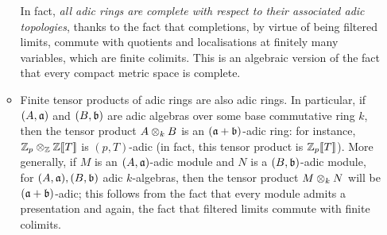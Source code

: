 \begin{example}
\begin{enumerate}
\begin{itemize}
                            In fact, \textit{all adic rings are complete with respect to their associated adic topologies}, thanks to the fact that completions, by virtue of being filtered limits, commute with quotients and localisations at finitely many variables, which are finite colimits. This is an algebraic version of the fact that every compact metric space is complete.  
                            \item Finite tensor products of adic rings are also adic rings. In particular, if $(A, \mathfrak{a})$ and $(B, \mathfrak{b})$ are adic algebras over some base commutative ring $k$, then the tensor product $A \tensor_k B$ is an $(\mathfrak{a} + \mathfrak{b})$-adic ring: for instance, $\Z_p \tensor_{\Z} \Z[\![T]\!]$ is $(p, T)$-adic (in fact, this tensor product is $\mathbb{Z}_p[\![T]\!]$). More generally, if $M$ is an $(A, \mathfrak{a})$-adic module and $N$ is a $(B, \mathfrak{b})$-adic module, for $(A, \mathfrak{a}), (B, \mathfrak{b})$ adic $k$-algebras, then the tensor product $M \tensor_k N$ will be $(\mathfrak{a} + \mathfrak{b})$-adic; this follows from the fact that every module admits a presentation and again, the fact that filtered limits commute with finite colimits. 
                            

\end{itemize}
\end{enumerate}
\end{example}
